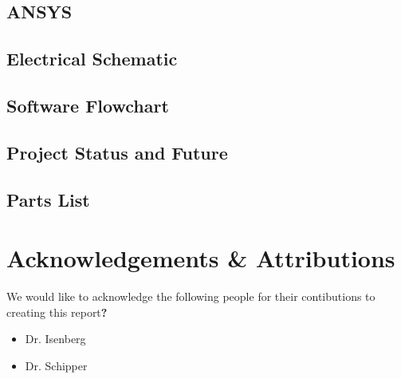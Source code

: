 \documentclass[12pt]{report}
\renewcommand\thesection{\arabic{section}}
\begin{document}
\newpage
\subsection{ANSYS}
\subsection{Electrical Schematic}
\subsection{Software Flowchart}
\subsection{Project Status and Future}
\subsection{Parts List}





% 
% 

\newpage
\section*{Acknowledgements \& Attributions}
We would like to acknowledge the following people for their contibutions to creating this report\textbf{?}
\begin{itemize}
  \item Dr. Isenberg
  \item Dr. Schipper
\end{itemize}

\newpage
\appendix
\renewcommand\thesection{\Roman{section}}
\renewcommand\thesubsection{\roman{subsection}}
\end{document}
